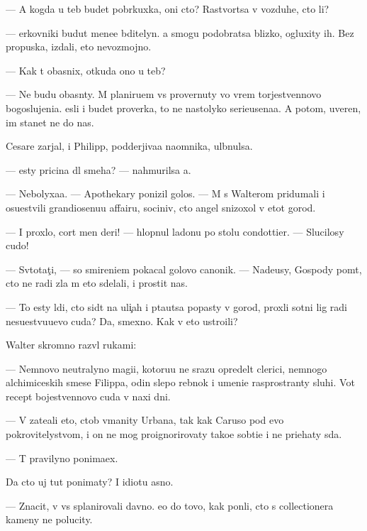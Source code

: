 \documentclass[10pt]{book}
\begin{document}
— A kogda u teb{\ia} budet pobr{\ia}kuxka, oni cto? Rastvor{\ia}tsa v vozduhe, cto li?

— {\C}erkovniki budut mene{\y}e bditelyn{\yi}. {\Y}a smogu podobratsa blizko, ogluxity ih. Bez propuska, izdali, eto nevozmojno.

— Kak t{\yi} ob{\y}asnix, otkuda ono u teb{\ia}?

— Ne budu ob{\y}asn{\ia}ty. M{\yi} planiru{\y}em vs{\e} provernuty vo vrem{\ia} torjestvennovo bogoslujeni{\y}a. {\Y}esli i budet proverka, to ne nastolyko serieusena{\y}a. A potom, uveren, im stanet ne do nas.

Cesare zarjal, i Philipp, podderjiva{\y}a na{\y}omnika, ul{\yi}bnulsa.

— {\Y}esty pricina dl{\ia} smeha? — nahmurilsa {\y}a.

— Nebolyxa{\y}a. — Apothekary ponizil golos. — M{\yi} s Walterom pridumali i osu{\x}estvili grandiosenu{\y}u affairu, sociniv, cto angel snizoxol v etot gorod.

— I proxlo, cort men{\ia} deri! — hlopnul ladon{\y}u po stolu condottier. — Slucilosy cudo!

— Sv{\ia}totat{\c}i, — so smireni{\y}em pokacal golovo{\y} canonik. — Nade{\y}usy, Gospody po{\y}m{\e}t, cto ne radi zla m{\yi} eto sdelali, i prostit nas.

— To {\y}esty l{\io}di, cto sid{\ia}t na uli{\c}ah i p{\yi}ta{\y}utsa popasty v gorod, proxli sotni lig radi nesu{\x}estvu{\y}u{\x}evo cuda? Da, smexno. Kak v{\yi} eto ustro{\y}ili?

Walter skromno razv{\e}l rukami:

— Nemnovo neutralyno{\y} magi{\y}i, kotoru{\y}u ne srazu opredel{\ia}t clerici, nemnogo alchimiceskih smese{\y} Filippa, odin slepo{\y} reb{\e}nok i umeni{\y}e rasprostran{\ia}ty sluhi. Vot recept bojestvennovo cuda v naxi dni.

— V{\yi} zate{\y}ali eto, ctob{\yi} v{\yi}manity Urbana, tak kak Caruso pod {\y}evo pokrovitelystvom, i on ne mog proignorirovaty tako{\y}e sob{\yi}ti{\y}e i ne pri{\y}ehaty s{\io}da.

— T{\yi} pravilyno ponima{\y}ex.

Da cto uj tut ponimaty? I idiotu {\y}asno.

— Znacit, v{\yi} vs{\e} splanirovali davno. {\Y}e{\x}o do tovo, kak pon{\ia}li, cto s collectionera kameny ne polucity.
\end{document}
